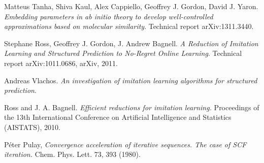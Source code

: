 \documentclass[twoside]{article}
\begin{document}
\begin{thebibliography}{9}
  Matteus Tanha, Shiva Kaul, Alex Cappiello, Geoffrey J. Gordon, David J. Yaron.
  \emph{Embedding parameters in ab initio theory to develop well-controlled approximations based on molecular similarity}.
  Technical report arXiv:1311.3440.
  
  Stephane Ross, Geoffrey J. Gordon, J. Andrew Bagnell.
  \emph{A Reduction of Imitation Learning and Structured Prediction to No-Regret Online Learning}.
  Technical report arXiv:1011.0686, arXiv, 2011.
  
  Andreas Vlachos.
  \emph{An investigation of imitation learning algorithms for structured prediction}.
  
    Ross and J. A. Bagnell.
  \emph{Efficient reductions for imitation
learning.} Proceedings of the 13th International
Conference on Artificial Intelligence and Statistics (AISTATS),
2010.

   P\'{e}ter Pulay,
  \emph{Convergence acceleration of iterative sequences. The case of SCF iteration.} Chem. Phys. Lett. 73, 393 (1980).

\end{thebibliography}
\end{document}
